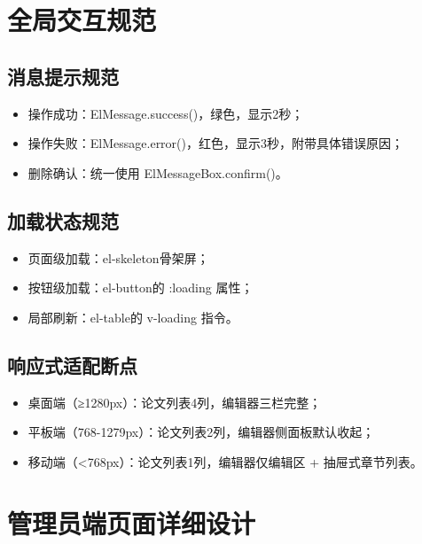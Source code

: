 \documentclass{../softeng}
\begin{document}
\section{全局交互规范}

\subsection{消息提示规范}
\begin{itemize}
    \item 操作成功：ElMessage.success()，绿色，显示2秒；
    \item 操作失败：ElMessage.error()，红色，显示3秒，附带具体错误原因；
    \item 删除确认：统一使用 ElMessageBox.confirm()。
\end{itemize}

\subsection{加载状态规范}
\begin{itemize}
    \item 页面级加载：el-skeleton骨架屏；
    \item 按钮级加载：el-button的 :loading 属性；
    \item 局部刷新：el-table的 v-loading 指令。
\end{itemize}

\subsection{响应式适配断点}
\begin{itemize}
    \item 桌面端（≥1280px）：论文列表4列，编辑器三栏完整；
    \item 平板端（768-1279px）：论文列表2列，编辑器侧面板默认收起；
    \item 移动端（<768px）：论文列表1列，编辑器仅编辑区 + 抽屉式章节列表。
\end{itemize}

\section{管理员端页面详细设计}
\end{document}
